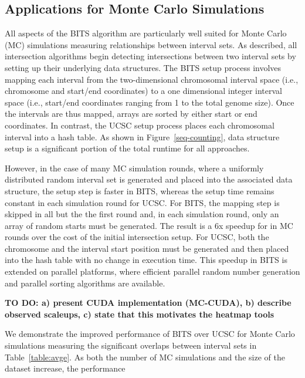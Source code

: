 \documentclass{bioinfo}
\begin{document}
\subsection{Applications for Monte Carlo Simulations}

All aspects of the BITS algorithm are particularly well suited for Monte 
Carlo (MC) simulations measuring relationships between interval sets. As 
described, all intersection algorithms begin detecting intersections between two 
interval sets by setting up their underlying data structures. The BITS setup
process
involves mapping each interval from the two-dimensional chromosomal 
interval space (i.e., chromosome and start/end coordinates) to a one
dimensional integer interval space (i.e., start/end coordinates ranging from
1 to the total genome size). Once the intervals are thus mapped, arrays are 
sorted by either start or end coordinates.  In contrast, the UCSC setup process
places each chromosomal interval into a hash table.  As shown in
Figure~\ref{seq-counting}, data structure setup is a significant portion of the 
total runtime for all approaches. 

However, in the case of many MC simulation rounds, where a uniformly 
distributed random interval set is generated and placed into the associated data 
structure, the setup step is faster in BITS, whereas the setup time remains 
constant in each simulation round for UCSC.  For BITS, the mapping step is
skipped in all but the the first round and, in each simulation round, 
only an array of random starts must be generated. The result is a 6x speedup 
for in MC rounds over the cost of the initial intersection setup.
For UCSC, both the chromosome and the interval start position must be generated
and then placed into the hash table with no change in execution time.
This speedup in BITS is extended on parallel platforms, where efficient parallel 
random number generation and parallel sorting algorithms are available.  

\textbf{TO DO: a) present CUDA implementation (MC-CUDA), b) describe observed 
scaleups, c) state that this motivates the heatmap tools}

We demonstrate the improved performance of BITS over UCSC for Monte Carlo 
simulations measuring the significant overlaps between interval sets in 
Table~\ref{table:avge}.  As both the number of MC simulations and the size of the dataset increase, the performance 
\end{document}
